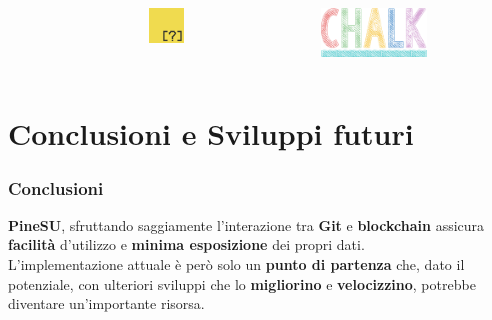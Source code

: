 \documentclass{beamer}
\begin{document}
\begin{frame}
\begin{columns}
\begin{figure}
		\end{figure} 
		\bigskip
		\centering
		\bigskip\bigskip\bigskip
		\begin{figure}
			\includegraphics[width=0.5\textwidth]{figures/inquirer.png}
		\end{figure}
		\bigskip\bigskip
		\begin{figure}
			\includegraphics[width=0.7\textwidth]{figures/chalk.png}
		\end{figure} 
	\end{columns}
\end{frame}

\section{Conclusioni e Sviluppi futuri}
\begin{frame}
	\frametitle{Conclusioni}
	\textbf{PineSU}, sfruttando saggiamente l'interazione tra \textbf{Git} e \textbf{blockchain}
	assicura \textbf{facilità} d'utilizzo e \textbf{minima esposizione} dei propri dati.\\
	L'implementazione attuale è però solo un \textbf{punto di partenza} che, dato il potenziale,
	con ulteriori sviluppi che lo \textbf{migliorino} e \textbf{velocizzino}, potrebbe diventare un'importante risorsa.
\end{frame}
\end{document}
